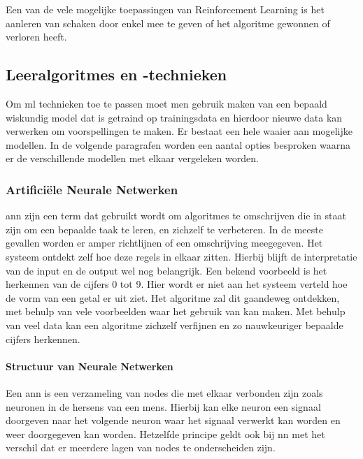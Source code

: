 		Een van de vele mogelijke toepassingen van Reinforcement Learning is het aanleren van schaken door enkel mee te geven of het algoritme gewonnen of verloren heeft.



	\subsection{Leeralgoritmes en -technieken}
	Om \gls{ml} technieken toe te passen moet men gebruik maken van een bepaald wiskundig model dat is getraind op trainingsdata en hierdoor nieuwe data kan verwerken om voorspellingen te maken. Er bestaat een hele waaier aan mogelijke modellen. In de volgende paragrafen worden een aantal opties besproken waarna er de verschillende modellen met elkaar vergeleken worden.
	
		\subsubsection{Artifici\"ele Neurale Netwerken}
		\gls{ann} zijn een term dat gebruikt wordt om algoritmes te omschrijven die in staat zijn om een bepaalde taak te leren, en zichzelf te verbeteren. In de meeste gevallen worden er amper richtlijnen of een omschrijving meegegeven. Het systeem ontdekt zelf hoe deze regels in elkaar zitten\cite{carbonell1983overview}. Hierbij blijft de interpretatie van de input en de output wel nog belangrijk. Een bekend voorbeeld is het herkennen van de cijfers 0 tot 9. Hier wordt er niet aan het systeem verteld hoe de vorm van een getal er uit ziet. Het algoritme zal dit gaandeweg ontdekken, met behulp van vele voorbeelden waar het gebruik van kan maken. Met behulp van veel data kan een algoritme zichzelf verfijnen en zo nauwkeuriger bepaalde cijfers herkennen.
		
			\paragraph{Structuur van Neurale Netwerken}
			Een \gls{ann} is een verzameling van nodes die met elkaar verbonden zijn zoals neuronen in de hersens van een mens. Hierbij kan elke neuron een signaal doorgeven naar het volgende neuron waar het signaal verwerkt kan worden en weer doorgegeven kan worden. Hetzelfde principe geldt ook bij \gls{nn} met het verschil dat er meerdere lagen van nodes te onderscheiden zijn. 
	
